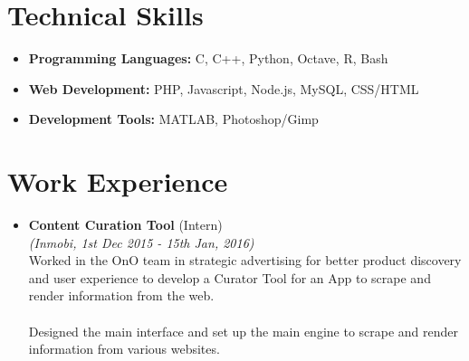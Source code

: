 \documentclass[a4paper, 10pt]{article}
\begin{document}
\section*{Technical Skills}

	\begin{itemize}
		\item \textbf{Programming Languages: } C, C++, Python, Octave, R, Bash
		\item \textbf{Web Development: } PHP, Javascript, Node.js, MySQL, CSS/HTML
		\item \textbf{Development Tools: } MATLAB, Photoshop/Gimp
	\end{itemize}

\section*{Work Experience}

	\begin{itemize}
		\item
			\textbf{Content Curation Tool} (Intern) \\
			\emph{(Inmobi, 1st Dec 2015 - 15th Jan, 2016)} \\
			
			Worked in the OnO team in strategic advertising for better product discovery and user experience to develop a Curator Tool for an App to scrape and render information from the web. \\ \\ Designed the main interface and set up the main engine to scrape and render information from various websites.
		
	\end{itemize}
\end{document}
